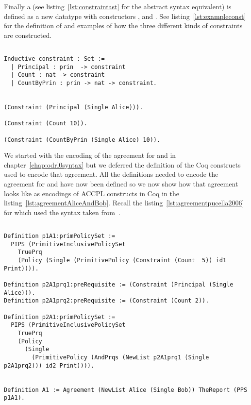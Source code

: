 Finally a  (see  listing~\ref{lst:constraintast} for the abstract syntax equivalent) is defined as a new datatype with constructors ,  and . See listing~\ref{lst:exampleconst} for the definition of  and examples of how the three different kinds of constraints are constructed.

\lstset{language=Coq}
\begin{minipage}[c]{0.95\textwidth}
\begin{lstlisting}[frame=single, caption={Constraint Definition and the Three Kinds of Constraints},label={lst:exampleconst}]

Inductive constraint : Set :=
  | Principal : prin  -> constraint 
  | Count : nat -> constraint 
  | CountByPrin : prin -> nat -> constraint.


(Constraint (Principal (Single Alice))).

(Constraint (Count 10)).

(Constraint (CountByPrin (Single Alice) 10)).

\end{lstlisting}
\end{minipage}


We started with the encoding of the agreement for  and  in chapter~\ref{chap:odrl0syntax} but we deferred the definition of the Coq constructs used to encode that agreement. All the definitions needed to encode the agreement for  and  have now been defined so we now show how that agreement looks like as encodings of \ac{ACCPL} constructs in Coq in the listing~\ref{lst:agreementAliceAndBob}. Recall the listing~\ref{lst:agreementpucella2006} for  which used the syntax taken from~\cite{pucella2006}.



\lstset{language=Coq}
\begin{lstlisting}[frame=single, caption={Agreement for Alice and Bob in \ac{ACCPL}},label={lst:agreementAliceAndBob}]

Definition p1A1:primPolicySet :=
  PIPS (PrimitiveInclusivePolicySet
    TruePrq
    (Policy (Single (PrimitivePolicy (Constraint (Count  5)) id1 Print)))).

Definition p2A1prq1:preRequisite := (Constraint (Principal (Single Alice))).
Definition p2A1prq2:preRequisite := (Constraint (Count 2)).

Definition p2A1:primPolicySet :=
  PIPS (PrimitiveInclusivePolicySet
    TruePrq
    (Policy 
      (Single 
        (PrimitivePolicy (AndPrqs (NewList p2A1prq1 (Single p2A1prq2))) id2 Print)))).


Definition A1 := Agreement (NewList Alice (Single Bob)) TheReport (PPS p1A1).
\end{lstlisting}	


